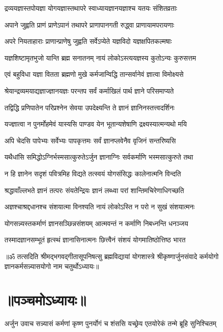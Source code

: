 \twolineshloka
{द्रव्ययज्ञास्तपोयज्ञा योगयज्ञास्तथापरे}
{स्वाध्यायज्ञानयज्ञाश्च यतयः संशितव्रताः}%

\twolineshloka
{अपाने जुह्वति प्राणं प्राणेऽपानं तथापरे}
{प्राणापानगती रुद्ध्वा प्राणायामपरायणाः}%

\twolineshloka
{अपरे नियताहाराः प्राणान्प्राणेषु जुह्वति}
{सर्वेऽप्येते यज्ञविदो यज्ञक्षपितकल्मषाः}%

\twolineshloka
{यज्ञशिष्टामृतभुजो यान्ति ब्रह्म सनातनम्}
{नायं लोकोऽस्त्ययज्ञस्य कुतोऽन्यः कुरुसत्तम}%

\twolineshloka
{एवं बहुविधा यज्ञा वितता ब्रह्मणो मुखे}
{कर्मजान्विद्धि तान्सर्वानेवं ज्ञात्वा विमोक्ष्यसे}%

\twolineshloka
{श्रेयान्द्रव्यमयाद्यज्ञाज्ज्ञानयज्ञः परन्तप}
{सर्वं कर्माखिलं पार्थ ज्ञाने परिसमाप्यते}%

\twolineshloka
{तद्विद्धि प्रणिपातेन परिप्रश्नेन सेवया}
{उपदेक्ष्यन्ति ते ज्ञानं ज्ञानिनस्तत्त्वदर्शिनः}%

\twolineshloka
{यज्ज्ञात्वा न पुनर्मोहमेवं यास्यसि पाण्डव}
{येन भूतान्यशेषाणि द्रक्ष्यस्यात्मन्यथो मयि}%

\twolineshloka
{अपि चेदसि पापेभ्यः सर्वेभ्यः पापकृत्तमः}
{सर्वं ज्ञानप्लवेनैव वृजिनं सन्तरिष्यसि}%

\twolineshloka
{यथैधांसि समिद्धोऽग्निर्भस्मसात्कुरुतेऽर्जुन}
{ज्ञानाग्निः सर्वकर्माणि भस्मसात्कुरुते तथा}%

\twolineshloka
{न हि ज्ञानेन सदृशं पवित्रमिह विद्यते}
{तत्स्वयं योगसंसिद्धः कालेनात्मनि विन्दति}%

\twolineshloka
{श्रद्धावाँल्लभते ज्ञानं तत्परः संयतेन्द्रियः}
{ज्ञानं लब्ध्वा परां शान्तिमचिरेणाधिगच्छति}%

\twolineshloka
{अज्ञश्चाश्रद्दधानश्च संशयात्मा विनश्यति}
{नायं लोकोऽस्ति न परो न सुखं संशयात्मनः}%

\twolineshloka
{योगसन्न्यस्तकर्माणं ज्ञानसञ्छिन्नसंशयम्}
{आत्मवन्तं न कर्माणि निबध्नन्ति धनञ्जय}%

\twolineshloka
{तस्मादज्ञानसम्भूतं हृत्स्थं ज्ञानासिनात्मनः}
{छित्त्वैनं संशयं योगमातिष्ठोत्तिष्ठ भारत}%

{॥ॐ तत्सदिति श्रीमद्भगवद्गीतासूपनिषत्सु ब्रह्मविद्यायां योगशास्त्रे श्रीकृष्णार्जुनसंवादे कर्मयोगो ज्ञानकर्मसन्न्यासयोगो नाम चतुर्थोऽध्यायः॥}

\section{॥पञ्चमोऽध्यायः॥}
{अर्जुन उवाच}
\twolineshloka
{सन्न्यासं कर्मणां कृष्ण पुनर्योगं च शंससि}
{यच्छ्रेय एतयोरेकं तन्मे ब्रूहि सुनिश्चितम्}%

